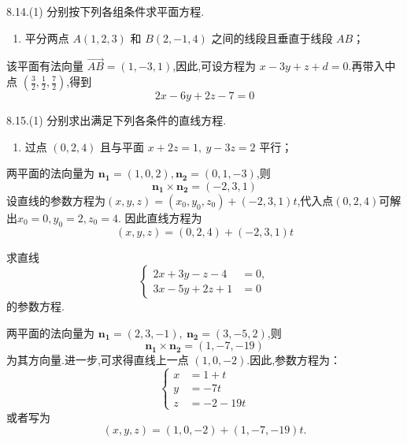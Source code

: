 \begin{exercise}{8.14.(1)}
    分别按下列各组条件求平面方程.
\begin{enumerate}
  \item 平分两点 $ A(1, 2, 3) $ 和 $ B(2, -1, 4) $ 之间的线段且垂直于线段 $ AB $；
\end{enumerate}
\end{exercise}

\begin{solution}
    该平面有法向量 $ \overrightarrow{AB} = (1, -3, 1) $,因此,可设方程为 $ x - 3y + z + d = 0 $.再带入中点 $ \left( \frac{3}{2}, \frac{1}{2}, \frac{7}{2} \right) $,得到
\[
2x - 6y + 2z - 7 = 0
\]
\end{solution}

\begin{exercise}{8.15.(1)}
    分别求出满足下列各条件的直线方程.
\begin{enumerate}
    \item 过点 $ (0, 2, 4) $ 且与平面 $ x + 2z = 1, \ y - 3z = 2 $ 平行；
\end{enumerate}
\end{exercise}

\begin{solution}
    两平面的法向量为 $ \mathbf{n_1} = (1, 0, 2), \mathbf{n_2} = (0, 1, -3) $,则
\[
\mathbf{n_1} \times \mathbf{n_2} = (-2, 3, 1)
\]
设直线的参数方程为$(x,y,z) = (x_0,y_0,z_0) + (-2,3,1)t$,代入点$(0,2,4)$可解出$x_0=0,y_0=2,z_0=4$.
因此直线方程为
\[
(x, y, z) = (0, 2, 4) + (-2, 3, 1)t
\]
\end{solution}

\begin{exercise}{8.16}
    求直线
\[
\left\{
\begin{aligned}
  2x + 3y - z - 4 &= 0, \\
  3x - 5y + 2z + 1 &= 0
\end{aligned}
\right.
\]
的参数方程.
\end{exercise}

\begin{solution}
    两平面的法向量为 $ \mathbf{n_1} = (2, 3, -1), \ \mathbf{n_2} = (3, -5, 2) $,则
\[
\mathbf{n_1} \times \mathbf{n_2} = (1, -7, -19)
\]
为其方向量.进一步,可求得直线上一点 $ (1, 0, -2) $.因此,参数方程为：
\[
\left\{
\begin{aligned}
x &= 1 + t \\
y &= -7t \\
z &= -2 - 19t
\end{aligned}
\right.
\]
或者写为
$$
(x,y,z) = (1,0,-2) + (1,-7,-19)t.
$$
\end{solution}

